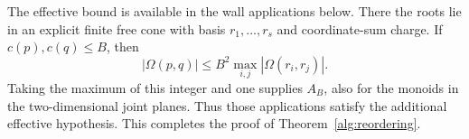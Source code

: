 The effective bound is available in the wall applications below.
There the roots lie in an explicit finite free cone with basis
$r_1,\ldots,r_s$ and coordinate-sum charge.  If $c(p),c(q)\le B$, then
\[
 |\Omega(p,q)|\le B^2\max_{i,j}|\Omega(r_i,r_j)|.
\]
Taking the maximum of this integer and one supplies $A_B$, also for
the monoids in the two-dimensional joint planes.  Thus those applications
satisfy the additional effective hypothesis.  This completes the proof
of Theorem~\ref{alg:reordering}.
